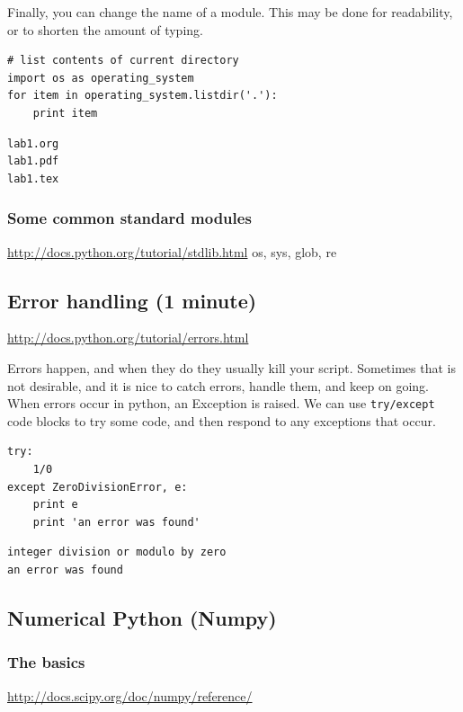 \documentclass[11pt]{article}
\begin{document}
Finally, you can change the name of a module. This may be done for readability, or to shorten the amount of typing.
\begin{verbatim}
# list contents of current directory
import os as operating_system
for item in operating_system.listdir('.'):
    print item
\end{verbatim}

\begin{verbatim}
lab1.org
lab1.pdf
lab1.tex
\end{verbatim}

\subsubsection{Some common standard modules}
\label{sec-3-7-1}
\url{http://docs.python.org/tutorial/stdlib.html}
os, sys, glob,  re


\subsection{Error handling (1 minute)}
\label{sec-3-8}
\url{http://docs.python.org/tutorial/errors.html}

Errors happen, and when they do they usually kill your script. Sometimes that is not desirable, and it is nice to catch errors, handle them, and keep on going. When errors occur in python, an Exception is raised. We can use \texttt{try/except} code blocks to try some code, and then respond to any exceptions that occur.

\begin{verbatim}
try:
    1/0
except ZeroDivisionError, e:
    print e
    print 'an error was found'
\end{verbatim}

\begin{verbatim}
integer division or modulo by zero
an error was found
\end{verbatim}


\subsection{Numerical Python (Numpy)}
\label{sec-3-9}

\subsubsection{The basics}
\label{sec-3-9-1}
\url{http://docs.scipy.org/doc/numpy/reference/}
\end{document}
